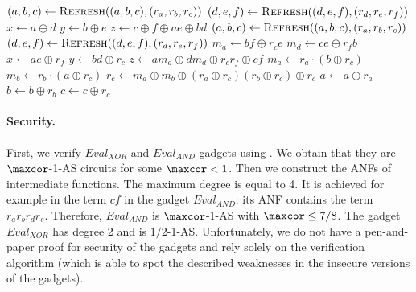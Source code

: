 \begin{algorithm}[ht]
    \begin{algorithmic}[1]
            \State {}
        \EndFunction
        \Statex
            \State {}
        \EndFunction
        \Statex
            \State $(a,b,c) \gets \textsc{Refresh}((a,b,c),(r_a,r_b,r_c))$
            \State $(d,e,f) \gets \textsc{Refresh}((d,e,f),(r_d,r_e,r_f))$
            \State $x \gets a \oplus d$
            \State $y \gets b \oplus e$
            \State $z \gets c \oplus f \oplus ae \oplus bd$
            \State {}
        \EndFunction
        \Statex
            \State $(a,b,c) \gets \textsc{Refresh}((a,b,c),(r_a,r_b,r_c))$
            \State $(d,e,f) \gets \textsc{Refresh}((d,e,f),(r_d,r_e,r_f))$
            \State $m_a \gets bf \oplus r_c e$
            \State $m_d \gets ce \oplus r_f b$
            \State $x \gets ae \oplus r_f$
            \State $y \gets bd \oplus r_c$
            \State $z \gets am_a \oplus dm_d \oplus r_c r_f \oplus cf$
            \State {}
        \EndFunction
        \Statex
            \State $m_a \gets r_a \cdot (b \oplus r_c)$
            \State $m_b \gets r_b \cdot (a \oplus r_c)$
            \State $r_c \gets
                m_a \oplus m_b \oplus
                (r_a \oplus r_c) (r_b \oplus r_c) \oplus
                r_c$
            \State $a \gets a \oplus r_a$
            \State $b \gets b \oplus r_b$
            \State $c \gets c \oplus r_c$
            \State {}
        \EndFunction
    \end{algorithmic}
\end{algorithm}

\paragraph{Security.}
First, we verify $Eval_{XOR}$ and $Eval_{AND}$ gadgets using . We obtain that they are $\maxcor$-1-AS circuits for some $\maxcor < 1$. Then we construct the ANFs of intermediate functions. The maximum degree is equal to 4. It is achieved for example in the term $cf$ in the gadget $Eval_{AND}$: its ANF contains the term $r_ar_br_dr_e$. Therefore, $Eval_{AND}$ is $\maxcor$-1-AS with $\maxcor \le 7/8$. The gadget $Eval_{XOR}$ has degree 2 and is $1/2$-1-AS. Unfortunately, we do not have a pen-and-paper proof for security of the gadgets and rely solely on the verification algorithm (which is able to spot the described weaknesses in the insecure versions of the gadgets).

